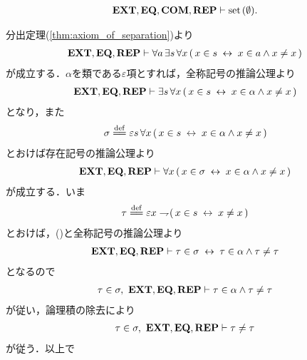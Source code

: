 	\begin{screen}
		\begin{thm}\label{thm:emptyset_is_a_set}
			\begin{align}
				\mbox{{\bf EXT}},\mbox{{\bf EQ}},\mbox{\bf COM},\mbox{{\bf REP}} \vdash \operatorname*{set}\hspace{0.15em}(\emptyset).
			\end{align}
		\end{thm}
	\end{screen}
	
	\begin{sketch}
		分出定理(\ref{thm:axiom_of_separation})より
		\begin{align}
			\mbox{{\bf EXT}},\mbox{{\bf EQ}},\mbox{{\bf REP}} \vdash \forall a\, \exists s\, \forall x\,
			(\, x \in s \hspace{0.25em}\leftrightarrow\hspace{0.25em} x \in a \wedge x \neq x\, )
			\label{fom:thm_emptyset_is_a_set_1}
		\end{align}
		が成立する．$\alpha$を類である$\varepsilon$項とすれば，全称記号の推論公理より
		\begin{align}
			\mbox{{\bf EXT}},\mbox{{\bf EQ}},\mbox{{\bf REP}} \vdash \exists s\, \forall x\,
			(\, x \in s \hspace{0.25em}\leftrightarrow\hspace{0.25em} x \in \alpha \wedge x \neq x\, )
		\end{align}
		となり，また
		\begin{align}
			\sigma \defeq \varepsilon s\, \forall x\,
			(\, x \in s \lrarrow x \in \alpha \wedge x \neq x\, )
		\end{align}
		とおけば存在記号の推論公理より
		\begin{align}
			\mbox{{\bf EXT}},\mbox{{\bf EQ}},\mbox{{\bf REP}} \vdash \forall x\,
			(\, x \in \sigma \hspace{0.25em}\leftrightarrow\hspace{0.25em} x \in \alpha \wedge x \neq x\, )
			\label{fom:thm_emptyset_is_a_set_2}
		\end{align}
		が成立する．いま
		\begin{align}
			\tau \defeq \varepsilon x \negation (\, x \in s \lrarrow x \neq x\, )
		\end{align}
		とおけば，()と全称記号の推論公理より
		\begin{align}
			\mbox{{\bf EXT}},\mbox{{\bf EQ}},\mbox{{\bf REP}} \vdash 
			\tau \in \sigma \hspace{0.25em}\leftrightarrow\hspace{0.25em} \tau \in \alpha \wedge \tau \neq \tau
		\end{align}
		となるので
		\begin{align}
			\tau \in \sigma,\ \mbox{{\bf EXT}},\mbox{{\bf EQ}},\mbox{{\bf REP}} \vdash
			\tau \in \alpha \wedge \tau \neq \tau
		\end{align}
		が従い，論理積の除去により
		\begin{align}
			\tau \in \sigma,\ \mbox{{\bf EXT}},\mbox{{\bf EQ}},\mbox{{\bf REP}} \vdash \tau \neq \tau
		\end{align}
		が従う．以上で
		\begin{align}

\end{align}
\end{sketch}
